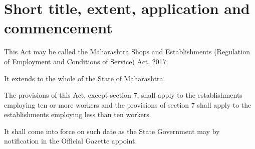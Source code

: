 \documentclass[gaz8]{mhact}
\begin{document}
\section{Short title, extent, application and commencement}

\begin{subsectionlist}
\item This Act may be called the Maharashtra Shops and Establishments
(Regulation of Employment and Conditions of Service) Act, 2017.
\item It extends to the whole of the State of Maharashtra.
\item The provisions of this Act, except section 7, shall apply to the
establishments employing ten or more workers and the provisions of section
7 shall apply to the establishments employing less than ten workers.
\item It shall come into force on such date as the State Government may by
notification in the Official Gazette appoint.
\end{subsectionlist}
\end{document}
